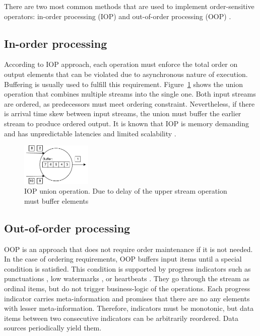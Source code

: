 
\label {fs-typical}

There are two most common methods that are used to implement order-sensitive operators: in-order processing (IOP) \cite{Arasu:2006:CCQ:1146461.1146463, Cranor:2003:GSD:872757.872838, hammad2004optimizing} and out-of-order processing (OOP) \cite{Li:2008:OPN:1453856.1453890}.

\subsection{In-order processing}
According to IOP approach, each operation must enforce the total order on output elements that can be violated due to asynchronous nature of execution. Buffering is usually used to fulfill this requirement. Figure~\ref{iop} shows the union operation that combines multiple streams into the single one. Both input streams are ordered, as predecessors must meet ordering constraint. Nevertheless, if there is arrival time skew between input streams, the union must buffer the earlier stream to produce ordered output. It is known that IOP is memory demanding and has unpredictable latencies and limited scalability \cite{Li:2008:OPN:1453856.1453890}.

\begin{figure}[htbp]
  \centering
  \includegraphics[width=0.30\textwidth]{pics/iop}
  \caption{IOP union operation. Due to delay of the upper stream operation must buffer elements}
  \label {iop}
\end{figure}

\subsection{Out-of-order processing}
OOP is an approach that does not require order maintenance if it is not needed. In the case of ordering requirements, OOP buffers input items until a special condition is satisfied. This condition is supported by progress indicators such as punctuations \cite{Tucker:2003:EPS:776752.776780}, low watermarks \cite{Akidau:2013:MFS:2536222.2536229}, or heartbeats \cite{Srivastava:2004:FTM:1055558.1055596}. They go through the stream as ordinal items, but do not trigger business-logic of the operations. Each progress indicator carries meta-information and promises that there are no any elements with lesser meta-information. Therefore, indicators must be monotonic, but data items between two consecutive indicators can be arbitrarily reordered. Data sources periodically yield them.

